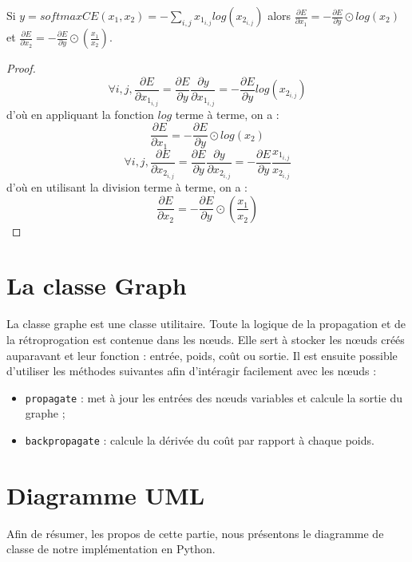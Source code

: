 \begin{proposition}
Si $y = softmaxCE(x_1, x_2) = -\sum_{i,j}{x_{1_{i,j}}log(x_{2_{i,j}})}$ alors $\frac{\partial E}{\partial x_1} = -\frac{\partial E}{\partial y} \odot log(x_2)$ et $\frac{\partial E}{\partial x_2} = -\frac{\partial E}{\partial y} \odot \left(\frac{x_1}{x_2}\right)$.
\end{proposition}

\begin{proof}
$$
\forall i, j, \frac{\partial E}{\partial x_{1_{i,j}}} = \frac{\partial E}{\partial y}\frac{\partial y}{\partial x_{1_{i,j}}} = -\frac{\partial E}{\partial y}log(x_{2_{i,j}})
$$
d'où en appliquant la fonction $log$ terme à terme, on a :
$$
\frac{\partial E}{\partial x_1} = -\frac{\partial E}{\partial y} \odot log(x_2)
$$
$$
\forall i, j, \frac{\partial E}{\partial x_{2_{i,j}}} = \frac{\partial E}{\partial y}\frac{\partial y}{\partial x_{2_{i,j}}} = -\frac{\partial E}{\partial y}\frac{x_{1_{i,j}}}{x_{2_{i,j}}}
$$
d'où en utilisant la division terme à terme, on a :
$$
\frac{\partial E}{\partial x_2} = -\frac{\partial E}{\partial y} \odot \left(\frac{x_1}{x_2}\right)
$$
\end{proof}

\section{La classe Graph}

La classe graphe est une classe utilitaire. Toute la logique de la propagation et de la rétroprogation est contenue dans les n\oe{}uds. Elle sert à stocker les n\oe{}uds créés auparavant et leur fonction : entrée, poids, coût ou sortie. Il est ensuite possible d'utiliser les méthodes suivantes afin d'intéragir facilement avec les n\oe{}uds :
\begin{itemize}
\item \texttt{propagate} : met à jour les entrées des n\oe{}uds variables et calcule la sortie du graphe ;
\item \texttt{backpropagate} : calcule la dérivée du coût par rapport à chaque poids.
\end{itemize} 

\section{Diagramme UML}

Afin de résumer, les propos de cette partie, nous présentons le diagramme de classe de notre implémentation en Python.

